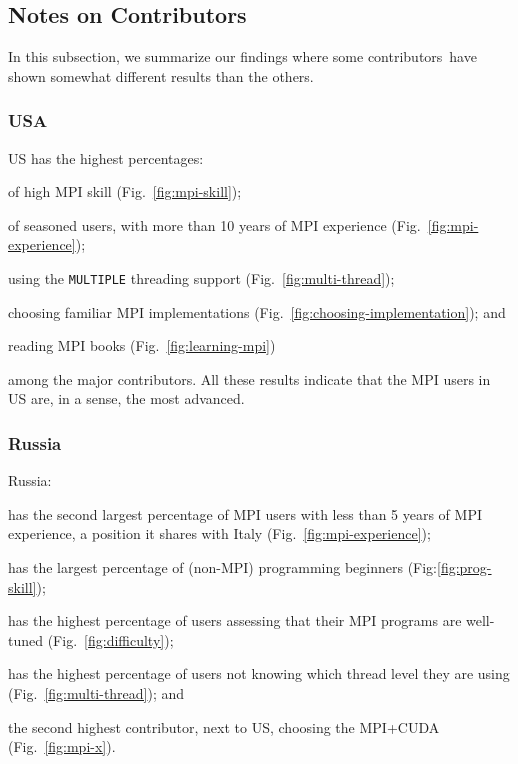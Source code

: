 \documentclass[preprint,5p,times]{elsarticle}
\newcommand{\revision}[2]{{\color{blue}#2}}
\def\country{contributor\xspace{}}%
\def\countries{contributors\xspace{}}%
\def\Countries{Contributors\xspace{}}%
\def\mcountries{major contributors\xspace{}}%
\begin{document}
\subsection{Notes on \Countries}

In this subsection, we summarize our findings where some
\revision{\countries have}{\countries\ have} shown
somewhat different results than the others.

\subsubsection*{USA}

US has the highest percentages:
\begin{enumerate*}
\item of high MPI skill (Fig.~\ref{fig:mpi-skill})\revision{,}{;}
\item of seasoned users, with more than 10 years of MPI experience (Fig.~\ref{fig:mpi-experience})\revision{,}{;}
\item using the {\tt MULTIPLE} threading support
  (Fig.~\ref{fig:multi-thread})\revision{,}{;}
\item choosing familiar MPI implementations
  (Fig.~\ref{fig:choosing-implementation})\revision{,}{;} and
\item reading MPI books (Fig.~\ref{fig:learning-mpi})
\end{enumerate*}
among the \mcountries. All these results indicate that the MPI
users in US are, \revision{by some standards}{in a sense,} the most advanced.

\subsubsection*{Russia}

Russia:
\begin{enumerate*}
\item has the second largest percentage of MPI users with less than 5
  years of MPI experience, a position it shares with Italy
  (Fig.~\ref{fig:mpi-experience})\revision{,}{;}
\item has the largest percentage of (non-MPI) programming beginners
  (Fig:\ref{fig:prog-skill})\revision{,}{;}
\item has the highest percentage of users assessing that their MPI programs are
  well-tuned (Fig.~\ref{fig:difficulty})\revision{,}{;}
\item has the highest percentage of users not knowing which thread level
  they are using (Fig.~\ref{fig:multi-thread})\revision{,}{;} and
\item the second highest \country, next to US, choosing the MPI+CUDA
  (Fig.~\ref{fig:mpi-x}).
\end{enumerate*}
\end{document}
